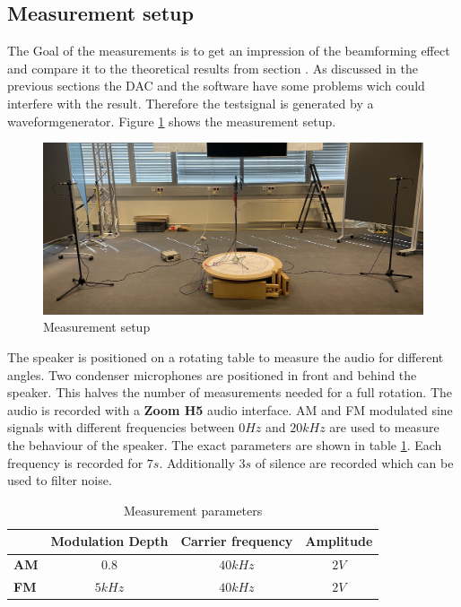 \subsection{Measurement setup}

The Goal of the measurements is to get an impression of the beamforming effect and compare it to the theoretical results from section . As discussed in the previous sections the DAC and the software have some problems wich could interfere with the result. Therefore the testsignal is generated by a waveformgenerator. Figure \ref{fig:meas:beam:setup} shows the measurement setup.
%
\begin{figure}
  \centering
  \includegraphics[height=\smallheight]{src/assets/pictures/measurements/beamforming_meas_setup.JPG}
  \caption{Measurement setup}\label{fig:meas:beam:setup}
\end{figure}
\p
The speaker is positioned on a rotating table to measure the audio for different angles. Two condenser microphones are positioned in front and behind the speaker. This halves the number of measurements needed for a full rotation. The audio is recorded with a \textbf{Zoom H5} audio interface.\p
%
AM and FM modulated sine signals with different frequencies between $0Hz$ and $20kHz$ are used to measure the behaviour of the speaker. The exact parameters are shown in table \ref{tab:meas:beam:params}. Each frequency is recorded for $7s$. Additionally $3s$ of silence are recorded which can be used to filter noise.
%
\begin{table}
  \caption{Measurement parameters}\label{tab:meas:beam:params}
  \begin{tabular}{l||c|c|c}
    & \textbf{Modulation Depth} & \textbf{Carrier frequency}  & \textbf{Amplitude}\\
    \hline
    \textbf{AM} & $0.8$         & $40kHz$                     & $2V$ \\
    \textbf{FM} & $5kHz$        & $40kHz$                     & $2V$ \\
  \end{tabular}
\end{table}